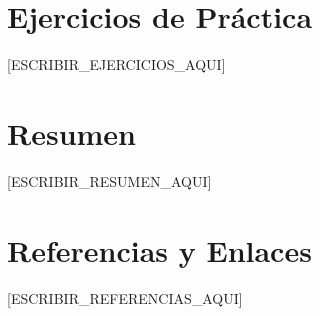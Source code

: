 \begin{teoria}
\section{Ejercicios de Práctica}

[ESCRIBIR_EJERCICIOS_AQUI]

% 
% 
% 


\section{Resumen}

[ESCRIBIR_RESUMEN_AQUI]

% 
% 


\section{Referencias y Enlaces}

[ESCRIBIR_REFERENCIAS_AQUI]


\end{teoria}

